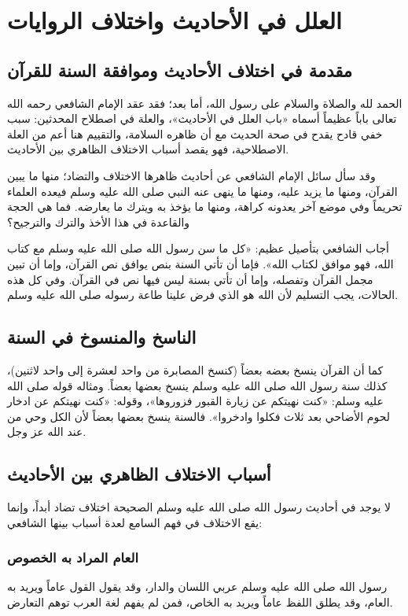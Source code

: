\chapter{العلل في الأحاديث واختلاف الروايات}

\section{مقدمة في اختلاف الأحاديث وموافقة السنة للقرآن}
الحمد لله والصلاة والسلام على رسول الله، أما بعد؛ فقد عقد الإمام الشافعي رحمه الله تعالى باباً عظيماً أسماه «باب العلل في الأحاديث»، والعلة في اصطلاح المحدثين: سبب خفي قادح يقدح في صحة الحديث مع أن ظاهره السلامة، والتقييم هنا أعم من العلة الاصطلاحية، فهو يقصد أسباب الاختلاف الظاهري بين الأحاديث.

وقد سأل سائل الإمام الشافعي عن أحاديث ظاهرها الاختلاف والتضاد؛ منها ما يبين القرآن، ومنها ما يزيد عليه، ومنها ما ينهى عنه النبي صلى الله عليه وسلم فيعده العلماء تحريماً وفي موضع آخر يعدونه كراهة، ومنها ما يؤخذ به ويترك ما يعارضه. فما هي الحجة والقاعدة في هذا الأخذ والترك والترجيح؟

أجاب الشافعي بتأصيل عظيم: «كل ما سن رسول الله صلى الله عليه وسلم مع كتاب الله، فهو موافق لكتاب الله». فإما أن تأتي السنة بنص يوافق نص القرآن، وإما أن تبين مجمل القرآن وتفصله، وإما أن تأتي بسنة ليس فيها نص في القرآن. وفي كل هذه الحالات، يجب التسليم لأن الله هو الذي فرض علينا طاعة رسوله صلى الله عليه وسلم.

\section{الناسخ والمنسوخ في السنة}
كما أن القرآن ينسخ بعضه بعضاً (كنسخ المصابرة من واحد لعشرة إلى واحد لاثنين)، كذلك سنة رسول الله صلى الله عليه وسلم ينسخ بعضها بعضاً. ومثاله قوله صلى الله عليه وسلم: «كنت نهيتكم عن زيارة القبور فزوروها»، وقوله: «كنت نهيتكم عن ادخار لحوم الأضاحي بعد ثلاث فكلوا وادخروا». فالسنة ينسخ بعضها بعضاً لأن الكل وحي من عند الله عز وجل.

\section{أسباب الاختلاف الظاهري بين الأحاديث}
لا يوجد في أحاديث رسول الله صلى الله عليه وسلم الصحيحة اختلاف تضاد أبداً، وإنما يقع الاختلاف في فهم السامع لعدة أسباب بينها الشافعي:

\subsection{العام المراد به الخصوص}
رسول الله صلى الله عليه وسلم عربي اللسان والدار، وقد يقول القول عاماً ويريد به العام، وقد يطلق اللفظ عاماً ويريد به الخاص، فمن لم يفهم لغة العرب توهم التعارض.

